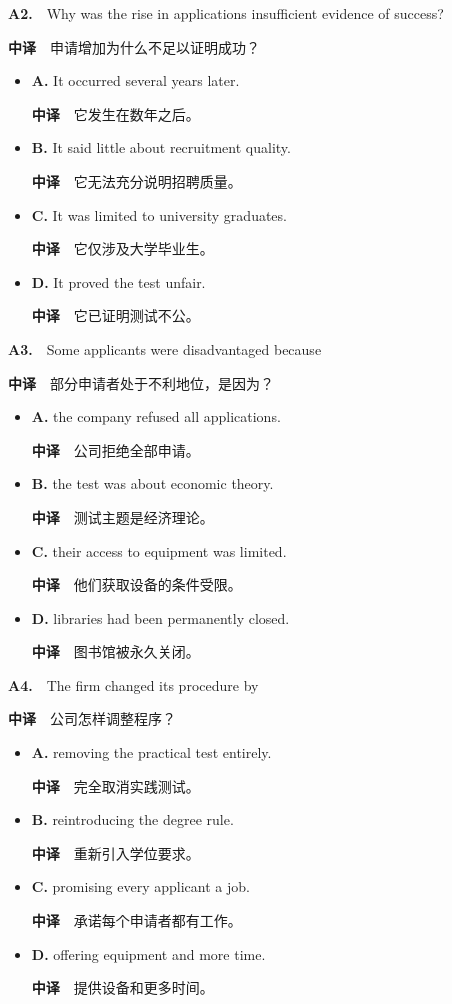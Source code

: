 \documentclass[
  11pt,
]{ctexart}
\begin{document}
\textbf{A2.}　Why was the rise in applications insufficient evidence of
success?

\textbf{中译}　申请增加为什么不足以证明成功？

\begin{itemize}
\item
  \textbf{A.} It occurred several years later.

  \textbf{中译}　它发生在数年之后。
\item
  \textbf{B.} It said little about recruitment quality.

  \textbf{中译}　它无法充分说明招聘质量。
\item
  \textbf{C.} It was limited to university graduates.

  \textbf{中译}　它仅涉及大学毕业生。
\item
  \textbf{D.} It proved the test unfair.

  \textbf{中译}　它已证明测试不公。
\end{itemize}

\textbf{A3.}　Some applicants were disadvantaged because

\textbf{中译}　部分申请者处于不利地位，是因为？

\begin{itemize}
\item
  \textbf{A.} the company refused all applications.

  \textbf{中译}　公司拒绝全部申请。
\item
  \textbf{B.} the test was about economic theory.

  \textbf{中译}　测试主题是经济理论。
\item
  \textbf{C.} their access to equipment was limited.

  \textbf{中译}　他们获取设备的条件受限。
\item
  \textbf{D.} libraries had been permanently closed.

  \textbf{中译}　图书馆被永久关闭。
\end{itemize}

\textbf{A4.}　The firm changed its procedure by

\textbf{中译}　公司怎样调整程序？

\begin{itemize}
\item
  \textbf{A.} removing the practical test entirely.

  \textbf{中译}　完全取消实践测试。
\item
  \textbf{B.} reintroducing the degree rule.

  \textbf{中译}　重新引入学位要求。
\item
  \textbf{C.} promising every applicant a job.

  \textbf{中译}　承诺每个申请者都有工作。
\item
  \textbf{D.} offering equipment and more time.

  \textbf{中译}　提供设备和更多时间。
\end{itemize}
\end{document}
